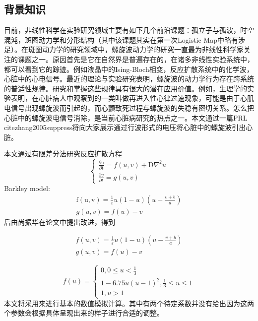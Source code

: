 

\subsection{背景知识}
目前，非线性科学在实验研究领域主要有如下几个前沿课题：孤立子与孤波，时空混沌，斑图动力学和分形结构（其中该课题其实在第一次Logistic Map中略有涉足）。在斑图动力学的研究领域中，螺旋波动力学的研究一直最为非线性科学家关注的课题之一。原因首先是它在自然界是普遍存在的，在诸多非线性实验系统中，都可以看到它的踪迹。例如液晶中的Ising-Bloch相变，反应扩散系统中的化学波，心脏中的心电信号。最近的理论与实验研究表明，螺旋波的动力学行为存在跨系统的普适性规律。研究和掌握这些规律具有很大的潜在应用价值。例如，生理学的实验表明，在心脏病人中观察到的一类叫做再进入性心律过速现象，可能是由于心肌电信号出现螺旋波而引起的，而心颤致死过程与螺旋波的失稳有密切关系。怎么把心脏中的螺旋波电信号消除，是当前心脏病研究的热点之一。本文通过一篇PRL cite{zhang2005suppress}将向大家展示通过行波形式的电压将心脏中的螺旋波引出心脏。

本文通过有限差分法研究反应扩散方程
\begin{equation}
\left\{\begin{array}{c}
\frac{\partial \mathrm{u}}{\partial \mathrm{t}}=f(u, v)+\mathrm{D} \nabla^{2} u \\
\frac{\partial v}{\partial t}=g(u, v)
\end{array}\right.
\end{equation}
Barkley model:
\begin{equation}
\begin{array}{c}
\mathrm{f}(\mathrm{u}, \mathrm{v})=\frac{1}{\varepsilon} u(1-u)\left(u-\frac{v+b}{a}\right) \\
g(u, v)=f(u)-v
\end{array}
\end{equation}
后由尚振华在论文中提出改进，得到

\begin{equation}
\begin{array}{c}
	f(u, v)=\frac{1}{\varepsilon} u(1-u)\left(u-\frac{v+b}{a}\right)\\
	g(u, v)=f(u)-v
\end{array}
\end{equation}

\begin{equation}
f(u)=\left\{\begin{array}{c}
0,0 \leq u<\frac{1}{3} \\
1-6.75 u(u-1)^{2}, \frac{1}{3} \leq u \leq 1 \\
1, u>1
\end{array}\right.
\end{equation}
本文将采用来进行基本的数值模拟计算。其中有两个待定系数并没有给出因为这两个参数会根据具体呈现出来的样子进行合适的调整。
